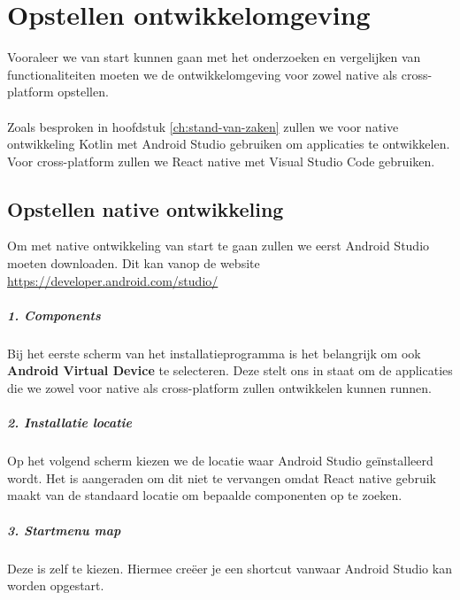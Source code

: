 
\chapter{Opstellen ontwikkelomgeving}%
\label{ch:ontwikkelomgeving}

Vooraleer we van start kunnen gaan met het onderzoeken en vergelijken van functionaliteiten 
moeten we de ontwikkelomgeving voor zowel native als cross-platform opstellen. 
\\\\
Zoals besproken in hoofdstuk \ref{ch:stand-van-zaken} zullen we voor native ontwikkeling Kotlin 
met Android Studio gebruiken om applicaties te ontwikkelen. Voor cross-platform zullen we React native 
met Visual Studio Code gebruiken.

\section{Opstellen native ontwikkeling}\label{se:native}
Om met native ontwikkeling van start te gaan zullen we eerst Android Studio moeten downloaden. 
Dit kan vanop de website \url{https://developer.android.com/studio/}

\paragraph{1. Components}
Bij het eerste scherm van het installatieprogramma is het belangrijk om ook 
\textbf{Android Virtual Device} te selecteren. Deze stelt ons in staat om de applicaties die we 
zowel voor native als cross-platform zullen ontwikkelen kunnen runnen. 

\paragraph{2. Installatie locatie}
Op het volgend scherm kiezen we de locatie waar Android Studio geïnstalleerd wordt. 
Het is aangeraden om dit niet te vervangen omdat React native gebruik maakt van de standaard 
locatie om bepaalde componenten op te zoeken. 

\paragraph{3. Startmenu map}
Deze is zelf te kiezen. Hiermee creëer je een shortcut vanwaar Android Studio kan worden opgestart.

